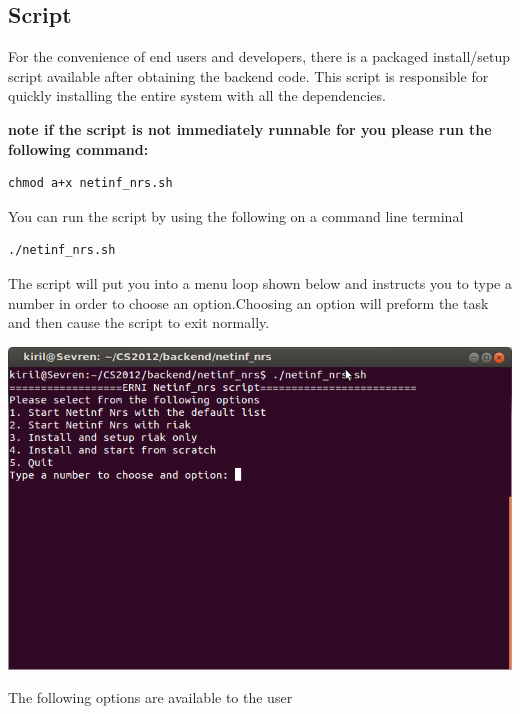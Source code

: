 \subsection{Script}

For the convenience of end users and developers, there is a packaged install/setup script available after obtaining the backend code. This script is responsible for quickly installing the entire system with all the dependencies.

\textbf{note if the script is not immediately runnable for you please run the following command:}
\begin{verbatim}
chmod a+x netinf_nrs.sh
\end{verbatim}

You can run the script by using the following on a command line terminal

\begin{verbatim}
./netinf_nrs.sh
\end{verbatim}

The script will put you into a menu loop shown below and instructs you to type a number in order to choose an option.Choosing an option will preform the task and then cause the script to exit normally.

\includegraphics[scale=0.5]{./img/Backend_install_script.png}

The following options are available to the user

